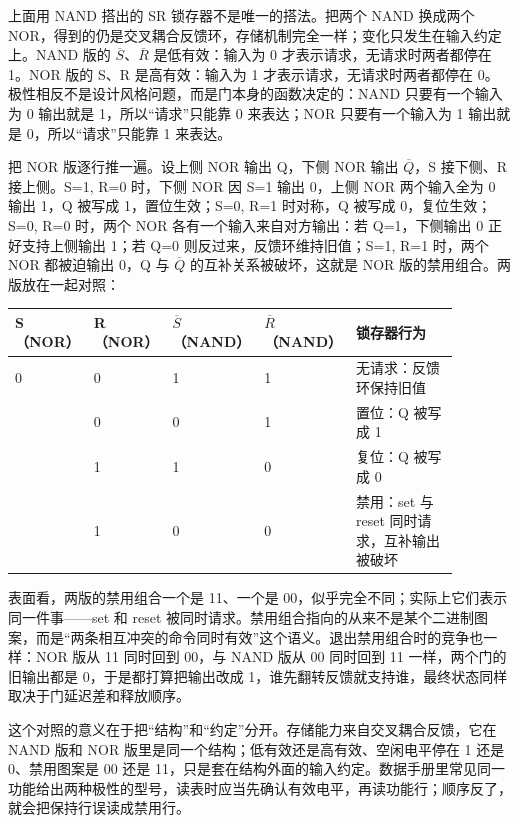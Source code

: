 
上面用 NAND 搭出的 SR 锁存器不是唯一的搭法。把两个 NAND 换成两个 NOR，得到的仍是交叉耦合反馈环，存储机制完全一样；变化只发生在输入约定上。NAND 版的 $\overline{S}$、$\overline{R}$ 是低有效：输入为 0 才表示请求，无请求时两者都停在 1。NOR 版的 S、R 是高有效：输入为 1 才表示请求，无请求时两者都停在 0。极性相反不是设计风格问题，而是门本身的函数决定的：NAND 只要有一个输入为 0 输出就是 1，所以“请求”只能靠 0 来表达；NOR 只要有一个输入为 1 输出就是 0，所以“请求”只能靠 1 来表达。

把 NOR 版逐行推一遍。设上侧 NOR 输出 Q，下侧 NOR 输出 $\overline{Q}$，S 接下侧、R 接上侧。S=1, R=0 时，下侧 NOR 因 S=1 输出 0，上侧 NOR 两个输入全为 0 输出 1，Q 被写成 1，置位生效；S=0, R=1 时对称，Q 被写成 0，复位生效；S=0, R=0 时，两个 NOR 各有一个输入来自对方输出：若 Q=1，下侧输出 0 正好支持上侧输出 1；若 Q=0 则反过来，反馈环维持旧值；S=1, R=1 时，两个 NOR 都被迫输出 0，Q 与 $\overline{Q}$ 的互补关系被破坏，这就是 NOR 版的禁用组合。两版放在一起对照：

\begin{longtable}{L{0.12\linewidth}L{0.12\linewidth}L{0.15\linewidth}L{0.15\linewidth}L{0.34\linewidth}}
\toprule
S（NOR） & R（NOR） & $\overline{S}$（NAND） & $\overline{R}$（NAND） & 锁存器行为 \\
 & 0 & 1 & 1 & 无请求：反馈环保持旧值 \\ & 0 & 0 & 1 & 置位：Q 被写成 1 \\ & 1 & 1 & 0 & 复位：Q 被写成 0 \\ & 1 & 0 & 0 & 禁用：set 与 reset 同时请求，互补输出被破坏 \\
\bottomrule
\end{longtable}

表面看，两版的禁用组合一个是 11、一个是 00，似乎完全不同；实际上它们表示同一件事——set 和 reset 被同时请求。禁用组合指向的从来不是某个二进制图案，而是“两条相互冲突的命令同时有效”这个语义。退出禁用组合时的竞争也一样：NOR 版从 11 同时回到 00，与 NAND 版从 00 同时回到 11 一样，两个门的旧输出都是 0，于是都打算把输出改成 1，谁先翻转反馈就支持谁，最终状态同样取决于门延迟差和释放顺序。

这个对照的意义在于把“结构”和“约定”分开。存储能力来自交叉耦合反馈，它在 NAND 版和 NOR 版里是同一个结构；低有效还是高有效、空闲电平停在 1 还是 0、禁用图案是 00 还是 11，只是套在结构外面的输入约定。数据手册里常见同一功能给出两种极性的型号，读表时应当先确认有效电平，再读功能行；顺序反了，就会把保持行误读成禁用行。

